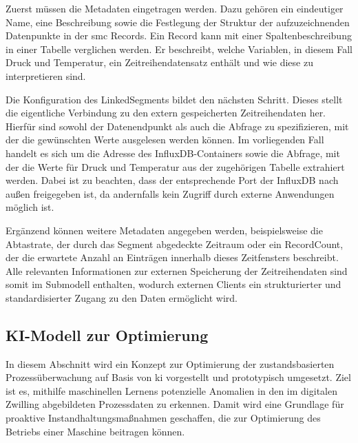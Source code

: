 Zuerst müssen die Metadaten eingetragen werden. 
Dazu gehören ein eindeutiger Name, eine Beschreibung sowie die Festlegung der Struktur der aufzuzeichnenden Datenpunkte in der \acs{smc} Records.
Ein Record kann mit einer Spaltenbeschreibung in einer Tabelle verglichen werden.
Er beschreibt, welche Variablen, in diesem Fall Druck und Temperatur, ein Zeitreihendatensatz enthält und wie diese zu interpretieren sind.

Die Konfiguration des LinkedSegments bildet den nächsten Schritt.
Dieses stellt die eigentliche Verbindung zu den extern gespeicherten Zeitreihendaten her. 
Hierfür sind sowohl der Datenendpunkt als auch die Abfrage zu spezifizieren, mit der die gewünschten Werte ausgelesen werden können. 
Im vorliegenden Fall handelt es sich um die Adresse des InfluxDB-Containers sowie die Abfrage, mit der die Werte für Druck und Temperatur aus der zugehörigen Tabelle extrahiert werden. 
Dabei ist zu beachten, dass der entsprechende Port der InfluxDB nach außen freigegeben ist, da andernfalls kein Zugriff durch externe Anwendungen möglich ist.

Ergänzend können weitere Metadaten angegeben werden, beispielsweise die Abtastrate, der durch das Segment abgedeckte Zeitraum oder ein RecordCount, der die erwartete Anzahl an Einträgen innerhalb dieses Zeitfensters beschreibt.
Alle relevanten Informationen zur externen Speicherung der Zeitreihendaten sind somit im Submodell enthalten, wodurch externen Clients ein strukturierter und standardisierter Zugang zu den Daten ermöglicht wird.

\newpage
\subsection{KI-Modell zur Optimierung}
In diesem Abschnitt wird ein Konzept zur Optimierung der zustandsbasierten Prozessüberwachung auf Basis von \acs{ki} vorgestellt und prototypisch umgesetzt.
Ziel ist es, mithilfe maschinellen Lernens potenzielle Anomalien in den im digitalen Zwilling abgebildeten Prozessdaten zu erkennen.
Damit wird eine Grundlage für proaktive Instandhaltungsmaßnahmen geschaffen, die zur Optimierung des Betriebs einer Maschine beitragen können.



